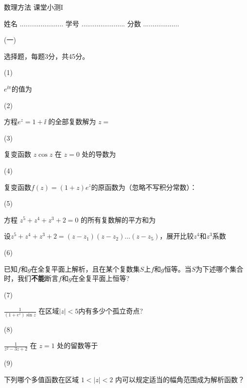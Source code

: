 \documentclass[12pt,CJK]{article}
\begin{document}
\bch
{\large 数理方法 课堂小测I}

{\vskip 0.2in}

姓名 ....................... {\hskip 0.5in}    学号 .......................{\hskip 0.5in}  分数 ...................

\bitem
\item[(一)]{选择题，每题3分，共45分。

  \bitem
\item[(1)]{ $e^{\ii \pi}$的值为  
  
   }
\item[(2)]{方程$e^z = 1 +\ii$ 的全部复数解为 $z=$ 


}


\item[(3)]{复变函数 $z\cos z$ 在 $z=0$ 处的导数为 
  
  }

\item[(4)]{复变函数$f(z) = (1+z)e^z$的原函数为（忽略不写积分常数）： 

  }
\item[(5)]{方程 $z^5+ z^4+z^3+2=0$ 的所有复数解的平方和为  


{\red \small 设$z^5+z^4+z^3+2 = (z-z_1)(z-z_2)\ldots(z-z_5)$，展开比较$z^4$和$z^3$系数}
}  

\item[(6)]{已知$f$和$g$在全复平面上解析，且在某个复数集$S$上$f$和$g$恒等。当$S$为下述哪个集合时，我们{\bf 不能}断言$f$和$g$在全复平面上恒等? 

  }
  
\item[(7)]{$\frac{1}{(1+e^z)\sin z}$ 在区域$|z|< 5 $内有多少个孤立奇点? 
  
  }
\item[(8)]{$\frac{1}{z^2-3z+2}$ 在 $z=1$ 处的留数等于 

    }  

\item[(9)]{下列哪个多值函数在区域 $1<|z|<2$ 内可以规定适当的幅角范围成为解析函数？ 

}}
\end{document}
